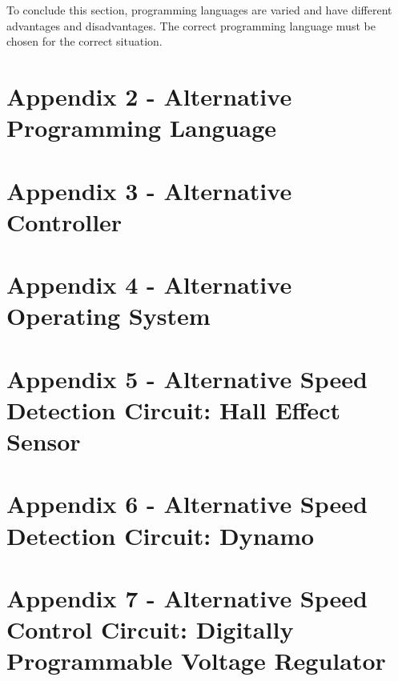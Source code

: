\documentclass[a4]{report}
\begin{document}
	To conclude this section,  programming languages are varied and have different advantages and disadvantages. The correct programming language must be chosen for the correct situation.\newline \newline  \noindent
\section{Appendix 2 -  Alternative Programming Language}
\section{Appendix 3 -  Alternative Controller}
\section{Appendix 4 -  Alternative Operating System}
\section{Appendix 5 -  Alternative Speed Detection Circuit: \newline Hall Effect Sensor}
\section{Appendix 6 -  Alternative Speed Detection Circuit: \newline Dynamo}
\section{Appendix 7 -  Alternative Speed Control Circuit: \newline Digitally Programmable Voltage Regulator}
\end{document}
